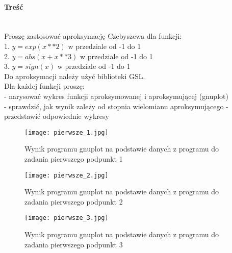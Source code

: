 \paragraph{Treść}~\\
Proszę zastosować aproksymację Czebyszewa dla funkcji:\\
1. $ y = exp(x**2) $ w przedziale od -1 do 1\\
2. $ y = abs(x+x**3) $ w przedziale od -1 do 1\\
3. $ y = sign(x) $ w przedziale od -1 do 1\\
Do aproksymacji należy użyć biblioteki GSL.\\
Dla każdej funkcji proszę:\\
- narysować wykres funkcji aproksymowanej i aproksymującej (gnuplot)\\
- sprawdzić, jak wynik zależy od stopnia wielomianu aproksymującego - przedstawić odpowiednie wykresy\\









\begin{figure}[p]
  \caption{Wynik programu gnuplot na podstawie danych z programu do zadania pierwszego podpunkt 1}
  \label{fig:Pierwsze1Jpg}
  \centering
  \texttt{[image: pierwsze\_1.jpg]}
\end{figure}

\begin{figure}[p]
  \caption{Wynik programu gnuplot na podstawie danych z programu do zadania pierwszego podpunkt 2}
  \label{fig:Pierwsze2Jpg}
  \centering
  \texttt{[image: pierwsze\_2.jpg]}
\end{figure}

\begin{figure}[p]
  \caption{Wynik programu gnuplot na podstawie danych z programu do zadania pierwszego podpunkt 3}
  \label{fig:Pierwsze3Jpg}
  \centering
  \texttt{[image: pierwsze\_3.jpg]}
\end{figure}

